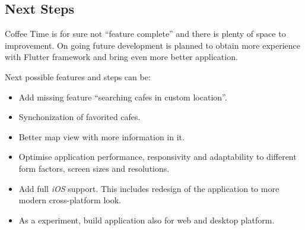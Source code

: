 \begin{conclusion}


\section{Next Steps}
Coffee Time is for sure not ``feature complete'' and there is plenty of space to improvement. On going future development is planned to obtain more experience with Flutter framework and bring even more better application. 

Next possible features and steps can be:

\begin{itemize}
    \item Add missing feature ``searching cafes in custom location''.
    \item Synchonization of favorited cafes.
    \item Better map view with more information in it.
    \item Optimise application performance, responsivity and adaptability to different form factors, screen sizes and resolutions.
    \item Add full \textit{iOS} support. This includes redesign of the application to more modern cross-platform look. 
    \item As a experiment, build application also for web and desktop platform.
\end{itemize}
	
\end{conclusion}